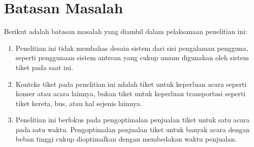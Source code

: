 \section{Batasan Masalah}
\label{sec:batasan-masalah}

Berikut adalah batasan masalah yang diambil dalam pelaksanaan penelitian ini:

\begin{enumerate}
  \item Penelitian ini tidak membahas desain sistem dari sisi pengalaman pengguna, seperti penggunaan sistem antrean yang cukup umum digunakan oleh sistem tiket pada saat ini.
  \item Konteks tiket pada penelitian ini adalah tiket untuk keperluan acara seperti konser atau acara lainnya, bukan tiket untuk keperluan transportasi seperti tiket kereta, bus, atau hal sejenis lainnya.
  \item Penelitian ini berfokus pada pengoptimalan penjualan tiket untuk satu acara pada satu waktu. Pengoptimalan penjualan tiket untuk banyak acara dengan beban tinggi cukup dioptimalkan dengan membedakan waktu penjualan.
\end{enumerate}

